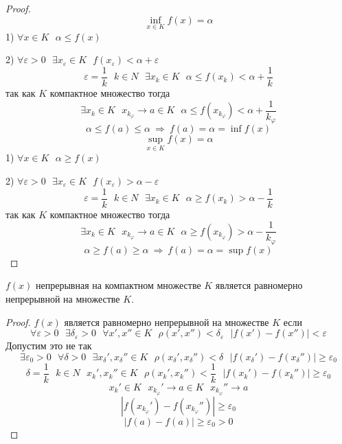 \begin{proof}
  $$
  \inf \limits_{x \in K} f(x) = \alpha
  $$
  1) $\forall x \in K ~~~ \alpha \le f(x)$

  2) $\forall \varepsilon > 0 ~~~ \exists x_{\varepsilon} \in K ~~~
  f(x_{\varepsilon}) < \alpha + \varepsilon$
  $$
  \varepsilon = \frac{1}{k} ~~~ k \in N ~~~ \exists x_k \in K ~~~
  \alpha \le f(x_k) < \alpha + \frac{1}{k}
  $$
  так как $K$ компактное множество тогда
  $$
  \exists x_k \in K ~~~ x_{k_{\varphi}} \to a \in K ~~~ \alpha \le
  f(x_{k_{\varphi}}) < \alpha + \frac{1}{k_{\varphi}}
  $$
  $$
  \alpha \le f(a) \le \alpha ~ \Rightarrow ~ f(a) = \alpha = \inf f(x)
  $$
  $$
  \sup \limits_{x \in K} f(x) = \alpha
  $$
  1) $\forall x \in K ~~~ \alpha \ge f(x)$

  2) $\forall \varepsilon > 0 ~~~ \exists x_{\varepsilon} \in K ~~~
  f(x_{\varepsilon}) > \alpha - \varepsilon$
  $$
  \varepsilon = \frac{1}{k} ~~~ k \in N ~~~ \exists x_k \in K ~~~
  \alpha \ge f(x_k) > \alpha - \frac{1}{k}
  $$
  так как $K$ компактное множество тогда
  $$
  \exists x_k \in K ~~~ x_{k_{\varphi}} \to a \in K ~~~ \alpha \ge
  f(x_{k_{\varphi}}) > \alpha - \frac{1}{k_{\varphi}}
  $$
  $$
  \alpha \ge f(a) \ge \alpha ~ \Rightarrow ~ f(a) = \alpha = \sup f(x)
  $$
\end{proof}

\begin{theorem}[Кантора]
  $f(x)$ непрерывная на компактном множестве $K$ является равномерно
  непрерывной на множестве $K$.
\end{theorem}

\begin{proof}
  $f(x)$ является равномерно непрерывной на множестве $K$ если
  $$
  \forall \varepsilon > 0 ~~~ \exists \delta_{\varepsilon} > 0 ~~~
  \forall x', x'' \in K ~~~ \rho(x', x'') < \delta_{\varepsilon} ~~~
  |f(x') - f(x'')| < \varepsilon
  $$
  Допустим это не так
  $$
  \exists \varepsilon_0 > 0 ~~~ \forall \delta > 0 ~~~ \exists x_{\delta}',
  x_{\delta}'' \in K ~~~ \rho(x_{\delta}', x_{\delta}'') < \delta ~~~
  |f(x_{\delta}') - f(x_{\delta}'')| \ge \varepsilon_0
  $$
  $$
  \delta = \frac{1}{k} ~~~ k \in N ~~~ x_k', x_k'' \in K ~~~
  \rho(x_k', x_k'') < \frac{1}{k} ~~~ |f(x_k') - f(x_k'')| \ge \varepsilon_0
  $$
  $$
  x_k' \in K ~~~ x_{k_{\varphi}}' \to a \in K ~~~ x_{k_{\varphi}}'' \to a
  $$
  $$
  |f(x_{k_{\varphi}}') - f(x_{k_{\varphi}}'')| \ge \varepsilon_0
  $$
  $$
  |f(a) - f(a)| \ge \varepsilon_0 > 0
  $$
\end{proof}

